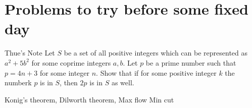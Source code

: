 \section{Problems to try before some fixed day}

\prob{}
{Thue's Note}{}{
    Let $S$ be a set of all positive integers which can be represented as
    $a^2+ 5b^2$ for some coprime integers $a,b$. Let $p$ be a prime number
    such that $p= 4n+ 3$ for some integer $n$. Show that if for some positive
    integer $k$ the numberk $p$ is in $S$, then $2p$ is in $S$ as well.
}

Konig's theorem, Dilworth theorem, Max flow Min cut
